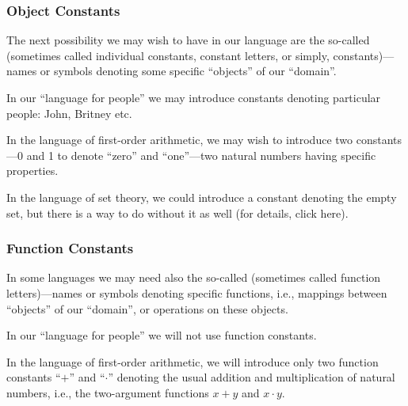 \subsubsection*{Object Constants}

The next possibility we may wish to have in our language are the so-called  (sometimes called individual constants, constant letters, or simply, constants)---names or symbols denoting some specific ``objects'' of our ``domain''.

\begin{example}
In our ``language for people'' we may introduce constants denoting particular people: John, Britney etc.
\end{example}

\begin{example}
In the language of first-order arithmetic, we may wish to introduce two constants---0 and 1 to denote ``zero'' and ``one''---two natural numbers having specific properties.
\end{example}

\begin{example}
In the language of set theory, we could introduce a constant denoting the empty set, but there is a way to do without it as well (for details, click here).
\end{example}

\subsubsection*{Function Constants}

In some languages we may need also the so-called  (sometimes called function letters)---names or symbols denoting specific functions, i.e., mappings between ``objects'' of our ``domain'', or operations on these objects.

\begin{example}
In our ``language for people'' we will not use function constants.
\end{example}

\begin{example}
In the language of first-order arithmetic, we will introduce only two function constants ``\(+\)'' and ``\(\cdot\)'' denoting the usual addition and multiplication of natural numbers, i.e., the two-argument functions \(x+y\) and \(x\cdot y\).
\end{example}

